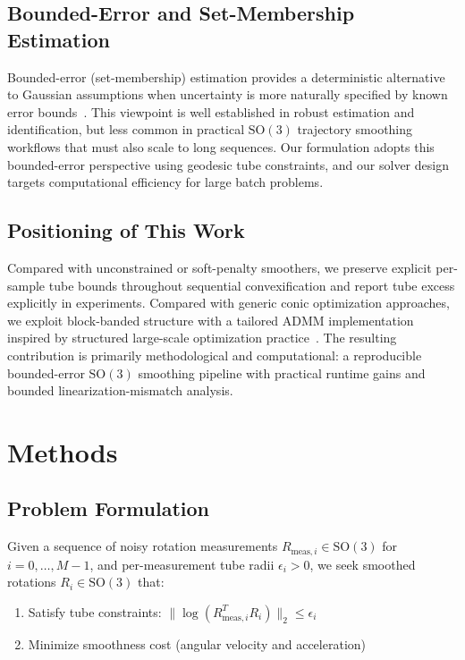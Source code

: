 \documentclass[letterpaper, 10 pt, conference]{ieeeconf}
\newcommand{\SO}{\mathrm{SO}(3)}
\begin{document}
\subsection{Bounded-Error and Set-Membership Estimation}

Bounded-error (set-membership) estimation provides a deterministic alternative to Gaussian assumptions when uncertainty is more naturally specified by known error bounds~\cite{walter1990,jaulin2001}. This viewpoint is well established in robust estimation and identification, but less common in practical $\SO$ trajectory smoothing workflows that must also scale to long sequences. Our formulation adopts this bounded-error perspective using geodesic tube constraints, and our solver design targets computational efficiency for large batch problems.

\subsection{Positioning of This Work}

Compared with unconstrained or soft-penalty smoothers, we preserve explicit per-sample tube bounds throughout sequential convexification and report tube excess explicitly in experiments. Compared with generic conic optimization approaches, we exploit block-banded structure with a tailored ADMM implementation inspired by structured large-scale optimization practice~\cite{boyd2011,boyd_scp}. The resulting contribution is primarily methodological and computational: a reproducible bounded-error $\SO$ smoothing pipeline with practical runtime gains and bounded linearization-mismatch analysis.

\section{Methods}
\label{sec:methods}

\subsection{Problem Formulation}

Given a sequence of noisy rotation measurements $R_{\text{meas},i} \in \SO$ for $i = 0, \ldots, M-1$, and per-measurement tube radii $\epsilon_i > 0$, we seek smoothed rotations $R_i \in \SO$ that:

\begin{enumerate}
\item Satisfy tube constraints: $\|\log(R_{\text{meas},i}^T R_i)\|_2 \leq \epsilon_i$
\item Minimize smoothness cost (angular velocity and acceleration)
\end{enumerate}
\end{document}
